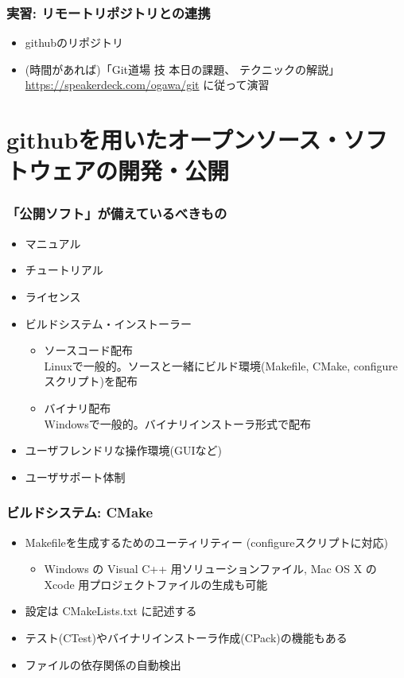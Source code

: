 \begin{frame}
  \frametitle{実習: リモートリポジトリとの連携}
  \begin{itemize}
  \item githubのリポジトリ
  \item (時間があれば)「Git道場 技 本日の課題、 テクニックの解説」 \\
    \url{https://speakerdeck.com/ogawa/git} に従って演習
  \end{itemize}
\end{frame}

\section{githubを用いたオープンソース・ソフトウェアの開発・公開}

\begin{frame}
  \frametitle{「公開ソフト」が備えているべきもの}
  \begin{itemize}
  \item マニュアル
  \item チュートリアル
  \item ライセンス
  \item ビルドシステム・インストーラー
    \begin{itemize}
    \item ソースコード配布 \\
      Linuxで一般的。ソースと一緒にビルド環境(Makefile, CMake, configure スクリプト)を配布
    \item バイナリ配布 \\
      Windowsで一般的。バイナリインストーラ形式で配布
    \end{itemize}
  \item ユーザフレンドリな操作環境(GUIなど)
  \item ユーザサポート体制
  \end{itemize}
\end{frame}

\begin{frame}
  \frametitle{ビルドシステム: CMake}
  \begin{itemize}
    \setlength{\itemsep}{1em}
  \item Makefileを生成するためのユーティリティー (configureスクリプトに対応)
    \begin{itemize}
    \item Windows の Visual C++ 用ソリューションファイル, Mac OS X の Xcode 用プロジェクトファイルの生成も可能
    \end{itemize}
  \item 設定は CMakeLists.txt に記述する
  \item テスト(CTest)やバイナリインストーラ作成(CPack)の機能もある
  \item ファイルの依存関係の自動検出
  \end{itemize}
\end{frame}

